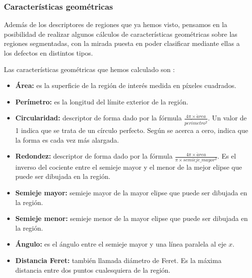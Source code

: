 




\subsubsection{Características geométricas}
Además de los descriptores de regiones que ya hemos visto, pensamos en la posibilidad de realizar algunos cálculos de características geométricas sobre las regiones segmentadas, con la mirada puesta en poder clasificar mediante ellas a los defectos en distintos tipos.

Las características geométricas que hemos calculado son \cite{analyzeij}:

\begin{itemize}

\item \textbf{Área:} es la superficie de la región de interés medida en píxeles cuadrados.

\item \textbf{Perímetro:} es la longitud del límite exterior de la región.

\item \textbf{Circularidad:} descriptor de forma dado por la fórmula $\frac{4\pi \times \acute{a}rea}{per\acute{i}metro^2}$. Un valor de 1 indica que se trata de un círculo perfecto. Según se acerca a cero, indica que la forma es cada vez más alargada.

\item \textbf{Redondez:} descriptor de forma dado por la fórmula $\frac{4\pi\times \acute{a}rea}{\pi \times semieje\_mayor^2}$. Es el inverso del cociente entre el semieje mayor y el menor de la mejor elipse que puede ser dibujada en la región.

\item \textbf{Semieje mayor:} semieje mayor de la mayor elipse que puede ser dibujada en la región.

\item \textbf{Semieje menor:} semieje menor de la mayor elipse que puede ser dibujada en la región.

\item \textbf{Ángulo:} es el ángulo entre el semieje mayor y una línea paralela al eje $x$.

\item \textbf{Distancia Feret:} también llamada diámetro de Feret. Es la máxima distancia entre dos puntos cualesquiera de la región.

\end{itemize}




